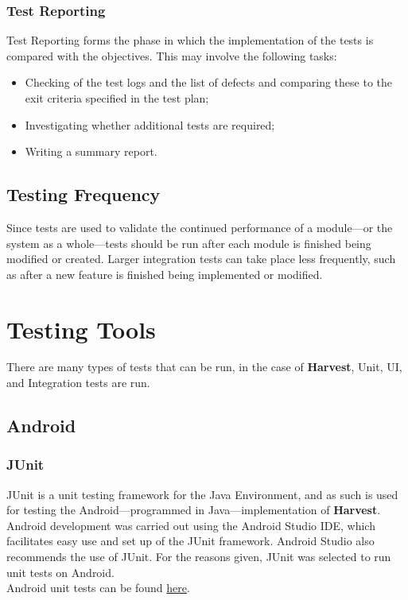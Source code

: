 \documentclass[12pt]{article}
\begin{document}
\subsubsection{Test Reporting}
Test Reporting forms the phase in which the implementation of the tests is compared with the objectives. This may involve the following tasks:
\begin{itemize}
 \item Checking of the test logs and the list of defects and comparing these to the exit criteria specified in the test plan;
\item Investigating whether additional tests are required;
\item Writing a summary report.
\end{itemize}
\subsection{Testing Frequency}
Since tests are used to validate the continued performance of a module---or the system as a whole---tests should be run after each module is finished being modified or created. Larger integration tests can take place less frequently, such as after a new feature is finished being implemented or modified.

  \section{Testing Tools}
  There are many types of tests that can be run, in the case of \textbf{Harvest}, Unit, UI, and Integration tests are run.
  \subsection{Android}
  \subsubsection{JUnit}
JUnit is a unit testing framework for the Java Environment, and as such is used for testing the Android---programmed in Java---implementation of \textbf{Harvest}. Android development was carried out using the Android Studio IDE, which facilitates easy use and set up of the JUnit framework. Android Studio also recommends the use of JUnit. For the reasons given, JUnit was selected to run unit tests on Android.\\
\indent Android unit tests can be found \href{https://github.com/BinaryNinjaz/COS301-Capstone/tree/master/Source/Android/Harvest/app/src/test/java/za/org/samac/harvest}{here}.
\end{document}
